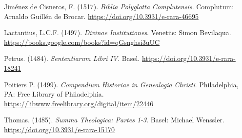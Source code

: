 \documentclass[
]{article}
\begin{document}
Jiménez de Cisneros, F. (1517). \emph{Biblia Polyglotta Complutensis}.
Complutum: Arnaldo Guillén de Brocar.
\url{https://doi.org/10.3931/e-rara-46695}

Lactantius, L.C.F. (1497). \emph{Divinae Institutiones}. Venetiis: Simon
Bevilaqua. \url{https://books.google.com/books?id=qGsnghsi3uUC}

Petrus. (1484). \emph{Sententiarum Libri IV}. Basel.
\url{https://doi.org/10.3931/e-rara-18241}

Poitiers P. (1499). \emph{Compendium Historiae in Genealogia Christi}.
Philadelphia, PA: Free Library of Philadelphia.
\url{https://libwww.freelibrary.org/digital/item/22446}

Thomas. (1485). \emph{Summa Theologica: Partes 1-3}. Basel: Michael
Wenssler. \url{https://doi.org/10.3931/e-rara-15170}
\end{document}

